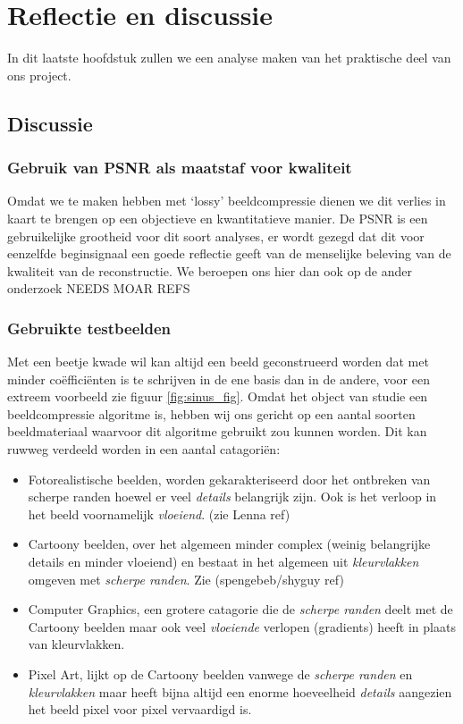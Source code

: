 \chapter{Reflectie en discussie}
In dit laatste hoofdstuk zullen we een analyse maken van het praktische deel van ons project.

\section{Discussie}
\subsection{Gebruik van PSNR als maatstaf voor kwaliteit}
Omdat we te maken hebben met `lossy' beeldcompressie dienen we dit verlies in kaart te brengen op een 
objectieve en kwantitatieve manier. 
De PSNR is een gebruikelijke grootheid voor dit soort analyses, er wordt gezegd dat dit voor eenzelfde 
beginsignaal een goede reflectie geeft van de menselijke beleving van de kwaliteit van de reconstructie.
We beroepen ons hier dan ook op de ander onderzoek NEEDS MOAR REFS


\subsection{Gebruikte testbeelden}
Met een beetje kwade wil kan altijd een beeld geconstrueerd worden dat met minder co\"effici\"enten is te schrijven
in de ene basis dan in de andere, voor een extreem voorbeeld zie figuur \ref{fig:sinus_fig}.
Omdat het object van studie een beeldcompressie algoritme is, hebben wij ons gericht op een aantal soorten 
beeldmateriaal waarvoor dit algoritme gebruikt zou kunnen worden. Dit kan ruwweg verdeeld worden in een aantal
catagori\"en:
\begin{itemize}
\item Fotorealistische beelden, worden gekarakteriseerd door het ontbreken van scherpe randen hoewel
  er veel \emph{details} belangrijk zijn. Ook is het verloop in het beeld voornamelijk \emph{vloeiend}. (zie Lenna ref)
\item Cartoony beelden, over het algemeen minder complex (weinig belangrijke details en minder vloeiend) 
  en bestaat in het algemeen uit \emph{kleurvlakken} omgeven met \emph{scherpe randen}. Zie (spengebeb/shyguy ref)
\item Computer Graphics, een grotere catagorie die de \emph{scherpe randen} deelt met de Cartoony beelden
  maar ook veel \emph{vloeiende} verlopen (gradients) heeft in plaats van kleurvlakken.
\item Pixel Art, lijkt op de Cartoony beelden vanwege de \emph{scherpe randen} en \emph{kleurvlakken}
  maar heeft bijna altijd een enorme hoeveelheid \emph{details} aangezien het beeld pixel voor pixel vervaardigd is.
\end{itemize}


